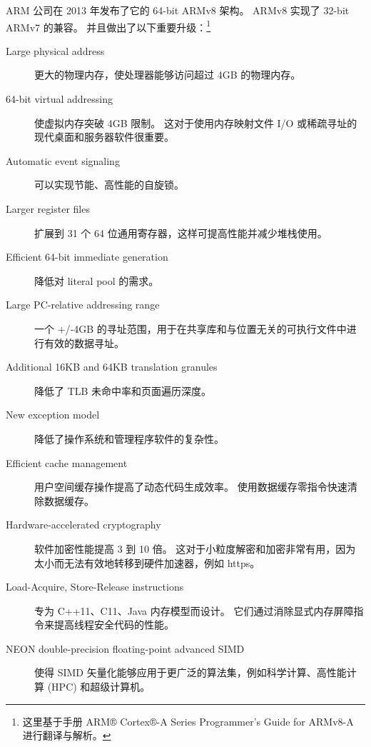 ARM 公司在 2013 年发布了它的 64-bit ARMv8 架构。
ARMv8 实现了 32-bit ARMv7 的兼容。
并且做出了以下重要升级：\footnote{
  这里基于手册 {ARM® Cortex®-A Series Programmer’s Guide for ARMv8-A}\cite{armpg} 进行翻译与解析。
}

\begin{description}
    \item[Large physical address] 更大的物理内存，使处理器能够访问超过 4GB 的物理内存。
    \item[64-bit virtual addressing] 使虚拟内存突破 4GB 限制。
      这对于使用内存映射文件 I/O 或稀疏寻址的现代桌面和服务器软件很重要。
    \item[Automatic event signaling] 可以实现节能、高性能的自旋锁。
    \item[Larger register files] 扩展到 31 个 64 位通用寄存器，这样可提高性能并减少堆栈使用。
    \item[Efficient 64-bit immediate generation] 降低对 literal pool 的需求。
    \item[Large PC-relative addressing range] 一个 +/‑4GB 的寻址范围，用于在共享库和与位置无关的可执行文件中进行有效的数据寻址。
    \item[Additional 16KB and 64KB translation granules] 降低了 TLB 未命中率和页面遍历深度。
    \item[New exception model] 降低了操作系统和管理程序软件的复杂性。
    \item[Efficient cache management] 用户空间缓存操作提高了动态代码生成效率。
      使用数据缓存零指令快速清除数据缓存。
    \item[Hardware-accelerated cryptography] 软件加密性能提高 3 到 10 倍。
      这对于小粒度解密和加密非常有用，因为太小而无法有效地转移到硬件加速器，例如 https。
    \item[Load-Acquire, Store-Release instructions] 专为 C++11、C11、Java 内存模型而设计。
      它们通过消除显式内存屏障指令来提高线程安全代码的性能。
    \item[NEON double-precision floating-point advanced SIMD] 使得 SIMD 矢量化能够应用于更广泛的算法集，例如科学计算、高性能计算 (HPC) 和超级计算机。
\end{description}


















